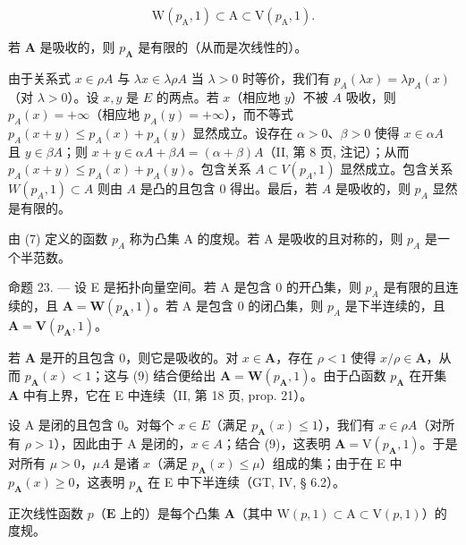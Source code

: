 \[
\mathrm{W} (p _ {\mathrm{A}}, 1) \subset \mathrm{A} \subset \mathrm{V} (p _ {\mathrm{A}}, 1).\tag{9}
\]

若 \(\mathbf{A}\) 是吸收的，则 \(p_{\mathbf{A}}\) 是有限的（从而是次线性的）。

由于关系式 \(x \in \rho A\) 与 \(\lambda x \in \lambda \rho A\) 当 \(\lambda > 0\) 时等价，我们有 \(p_A(\lambda x) = \lambda p_A(x)\)（对 \(\lambda > 0\)）。设 \(x, y\) 是 \(E\) 的两点。若 \(x\)（相应地 \(y\)）不被 \(A\) 吸收，则 \(p_A(x) = +\infty\)（相应地 \(p_A(y) = +\infty\)），而不等式 \(p_A(x + y) \leqslant p_A(x) + p_A(y)\) 显然成立。设存在 \(\alpha > 0\)、\(\beta > 0\) 使得 \(x \in \alpha A\) 且 \(y \in \beta A\)；则 \(x + y \in \alpha A + \beta A = (\alpha + \beta)A\)（II, 第 8 页, 注记）；从而 \(p_A(x + y) \leqslant p_A(x) + p_A(y)\)。包含关系 \(A \subset V(p_A, 1)\) 显然成立。包含关系 \(W(p_A, 1) \subset A\) 则由 \(A\) 是凸的且包含 0 得出。最后，若 \(A\) 是吸收的，则 \(p_A\) 显然是有限的。

由 (7) 定义的函数 \(p_{A}\) 称为凸集 A 的度规。若 A 是吸收的且对称的，则 \(p_{A}\) 是一个半范数。

命题 23. --- 设 E 是拓扑向量空间。若 A 是包含 0 的开凸集，则 \(p_{A}\) 是有限的且连续的，且 \(\mathbf{A} = \mathbf{W}(p_{\mathbf{A}}, 1)\)。若 A 是包含 0 的闭凸集，则 \(p_{A}\) 是下半连续的，且 \(\mathbf{A} = \mathbf{V}(p_{\mathbf{A}}, 1)\)。

若 \(\mathbf{A}\) 是开的且包含 0，则它是吸收的。对 \(x \in \mathbf{A}\)，存在 \(\rho < 1\) 使得 \(x / \rho \in \mathbf{A}\)，从而 \(p_{\mathbf{A}}(x) < 1\)；这与 (9) 结合便给出 \(\mathbf{A} = \mathbf{W}(p_{\mathbf{A}}, 1)\)。由于凸函数 \(p_{\mathbf{A}}\) 在开集 \(\mathbf{A}\) 中有上界，它在 E 中连续（II, 第 18 页, prop. 21）。

设 A 是闭的且包含 0。对每个 \(x \in E\)（满足 \(p_{\mathbf{A}}(x) \leqslant 1\)），我们有 \(x \in \rho A\)（对所有 \(\rho > 1\)），因此由于 A 是闭的，\(x \in A\)；结合 (9)，这表明 \(\mathbf{A} = \mathrm{V}(p_{\mathbf{A}}, 1)\)。于是对所有 \(\mu > 0\)，\(\mu A\) 是诸 \(x\)（满足 \(p_{\mathbf{A}}(x) \leqslant \mu\)）组成的集；由于在 E 中 \(p_{\mathbf{A}}(x) \geqslant 0\)，这表明 \(p_{\mathbf{A}}\) 在 E 中下半连续（GT, IV, § 6.2）。

正次线性函数 \(p\)（\(\mathbf{E}\) 上的）是每个凸集 \(\mathbf{A}\)（其中 \(\mathrm{W}(p,1)\subset \mathrm{A}\subset \mathrm{V}(p,1)\)）的度规。

